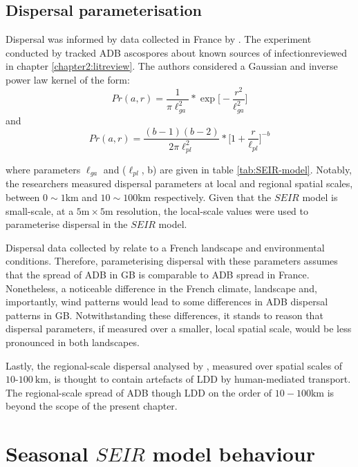 \subsection{Dispersal parameterisation}

Dispersal was informed by data collected in France by \cite{grosdidier2018tracking}.
The experiment conducted by \cite{grosdidier2018tracking} tracked ADB ascospores about known sources of infection\textemdash reviewed in chapter \ref{chapter2:litreview}.
The authors considered a Gaussian and inverse power law kernel of the form:
\begin{equation}
    Pr(a, r) = \frac{1}{\pi \ell_{ga}^2} * \exp\big[-\frac{r^2}{\ell_{ga}^2}\big]
\end{equation}
and
\begin{equation}
    Pr(a, r) = \frac{(b-1)(b-2)}{2\pi \ell_{pl}^2} * \big[ 1+ \frac{r}{\ell_{pl}}\big]^{-b}
\end{equation}

where parameters $\ell_{ga}$ and ($\ell_{pl}$, b) are given in table \ref{tab:SEIR-model}.
Notably, the researchers measured dispersal parameters at local and regional spatial scales, between $0 \sim 1\mathrm{km}$ and $10 \sim 100 \mathrm{km}$ respectively.
Given that the $SEIR$ model is small-scale, at a $5\mathrm{m} \times 5\mathrm{m}$ resolution, 
the local-scale values were used to parameterise dispersal in the $SEIR$ model.

Dispersal data collected by \cite{grosdidier2018tracking} relate to a French landscape and environmental conditions.
Therefore, parameterising dispersal with these parameters assumes that the spread of ADB in GB is comparable to ADB spread in France. 
Nonetheless, a noticeable difference in the French climate, landscape and, importantly, wind patterns would lead to some differences in ADB dispersal patterns in GB.
Notwithstanding these differences, it stands to reason that dispersal parameters, if measured over a smaller, local spatial scale, would be less pronounced in both landscapes. 

Lastly, the regional-scale dispersal analysed by \cite{grosdidier2018tracking}, measured over spatial scales of $10$-$100\ \mathrm{km}$, is thought to contain artefacts of LDD by human-mediated transport.
The regional-scale spread of ADB though LDD on the order of $10-100\mathrm{km}$ is beyond the scope of the present chapter.

\section{Seasonal $SEIR$ model behaviour}

